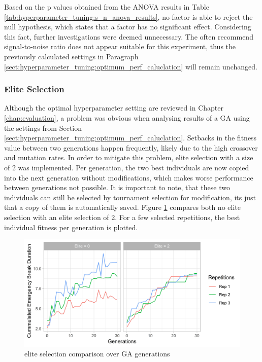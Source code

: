 Based on the p values obtained from the ANOVA results in Table \ref{tab:hyperparameter_tuning:s_n_anova_results}, no factor is able to reject the null hypothesis, which states that a factor has no significant effect. Considering this fact, further investigations were deemed unnecessary. The often recommend signal-to-noise ratio does not appear suitable for this experiment, thus the previously calculated settings in Paragraph \ref{sect:hyperparameter_tuning:optimum_perf_caluclation} will remain unchanged.

\subsubsection{Elite Selection}
Although the optimal hyperparameter setting are reviewed in Chapter \ref{chap:evaluation}, a problem was obvious when analysing results of a GA using the settings from Section \ref{sect:hyperparameter_tuning:optimum_perf_caluclation}. Setbacks in the fitness value between two generations happen frequently, likely due to the high crossover and mutation rates. In order to mitigate this problem, elite selection with a size of 2 was implemented. Per generation, the two best individuals are now copied into the next generation without modifications, which makes worse performance between generations not possible. It is important to note, that these two individuals can still be selected by tournament selection for modification, its just that a copy of them is automatically saved. Figure \ref{fig:hyperparameter_tuning:elite_no_elite_comp} compares both no elite selection with an elite selection of 2. For a few selected repetitions, the best individual fitness per generation is plotted.

\begin{figure}[ht] 
	\includegraphics[width=1\linewidth]{simulations/evaluation/plots/elite_vs_no_elite_generations}
	\caption{elite selection comparison over GA generations}
	\label{fig:hyperparameter_tuning:elite_no_elite_comp}
\end{figure}

